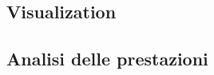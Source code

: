 \documentclass[conference]{IEEEtran}
\begin{document}
\subsection{Visualization}
\subsection{Analisi delle prestazioni}
\vspace{12pt}
\end{document}
